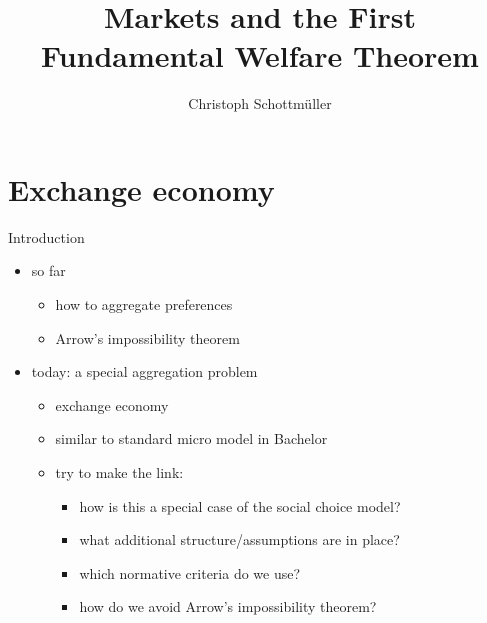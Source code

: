 \documentclass[bigger]{beamer}
\author{Christoph Schottmüller}
\date{}
\title{Markets and the First Fundamental Welfare Theorem}
\begin{document}
\maketitle

\section{Exchange economy}
\label{sec:orga1465f8}
\begin{frame}[label={sec:org359d21d}]{Introduction}
\begin{itemize}
\item so far
\begin{itemize}
\item how to aggregate preferences
\item Arrow's impossibility theorem
\end{itemize}
\item today: a special aggregation problem
\begin{itemize}
\item exchange economy
\item similar to standard micro model in Bachelor
\item try to make the link:
\begin{itemize}
\item how is this a special case of the social choice model?
\item what additional structure/assumptions are in place?
\item which normative criteria do we use?
\item how do we avoid Arrow's impossibility theorem?
\end{itemize}
\end{itemize}
\end{itemize}
\end{frame}
\end{document}
